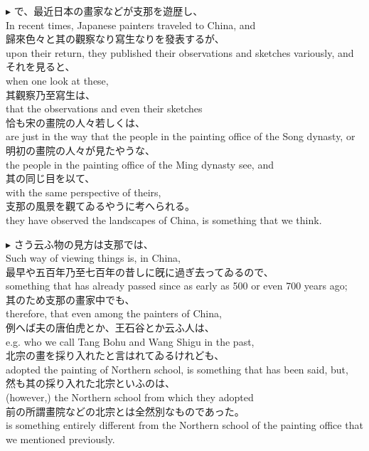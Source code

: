 \documentclass{ctexart}
\makeatletter
\newcommand*{\shifttext}[1]{%
  \settowidth{\@tempdima}{#1}%
  \hspace{-\@tempdima}#1%
}
\newcommand{\plabel}[1]{%
\shifttext{\textbf{#1}\quad}%
}
\makeatother
\begin{document}
\vspace{1em}
\plabel{$\blacktriangleright$}%
で、最近日本の畫家などが支那を遊歴し、\\
In recent times, Japanese painters traveled to China, and\\
歸來色々と其の觀察なり寫生なりを發表するが、\\
upon their return, they published their observations and sketches variously, and\\
それを見ると、\\
when one look at these,\\
其觀察乃至寫生は、\\
that the observations and even their sketches\\
恰も宋の畫院の人々若しくは、\\
are just in the way that the people in the painting office of the Song dynasty, or\\
明初の畫院の人々が見たやうな、\\
the people in the painting office of the Ming dynasty see, and\\
其の同じ目を以て、\\
with the same perspective of theirs,\\
支那の風景を觀てゐるやうに考へられる。\\
they have observed the landscapes of China, is something that we think.

\vspace{1em}
\plabel{$\blacktriangleright$}%
さう云ふ物の見方は支那では、\\
Such way of viewing things is, in China,\\
最早や五百年乃至七百年の昔しに旣に過ぎ去ってゐるので、\\
something that has already passed since as early as 500 or even 700 years ago;\\
其のため支那の畫家中でも、\\
therefore, that even among the painters of China,\\
例へば夫の唐伯虎とか、王石谷とか云ふ人は、\\
e.g. who we call Tang Bohu and Wang Shigu in the past,\\
北宗の畫を採り入れたと言はれてゐるけれども、\\
adopted the painting of Northern school, is something that has been said, but,\\
然も其の採り入れた北宗といふのは、\\
(however,) the Northern school from which they adopted\\
前の所謂畫院などの北宗とは全然別なものであった。\\
is something entirely different from the Northern school of the painting office that we mentioned previously.
\end{document}
